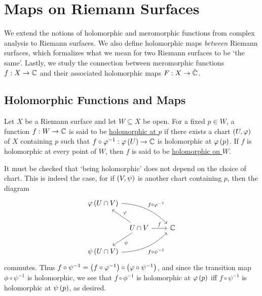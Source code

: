 \documentclass[../Moduli_Spaces_of_Riemann_Surfaces.tex]{subfiles}
\begin{document}
    \section{Maps on Riemann Surfaces}\label{sec:maps_on_Riemann_surfaces}
    We extend the notions of holomorphic and meromorphic functions from complex analysis to Riemann surfaces. We also define holomorphic maps \textit{between} Riemann surfaces, which formalizes what we mean for two Riemann surfaces to be `the same'. Lastly, we study the connection between meromorphic functions $f:X\to\mathbb{C}$ and their associated holomorphic maps $F:X\to\hat{\mathbb{C}}$.
    \subsection{Holomorphic Functions and Maps}
    \begin{definition}
        Let $X$ be a Riemann surface and let $W\subseteq X$ be open. For a fixed $p\in W$, a function $f:W\to\mathbb{C}$ is said to be \ul{holomorphic at $p$} if there exists a chart $\left(U,\varphi\right)$ of $X$ containing $p$ such that $f\circ\varphi^{-1}:\varphi\left(U\right)\to\mathbb{C}$ is holomorphic at $\varphi\left(p\right)$. If $f$ is holomorphic at every point of $W$, then $f$ is said to be \ul{holomorphic on $W$}.
    \end{definition}
    \begin{remark}
        It must be checked that $\textrm{`}$being holomorphic$\textrm{'}$ does not depend on the choice of chart. This is indeed the case, for if $\left(V,\psi\right)$ is another chart containing $p$, then the diagram
        \begin{equation}\label{RS:eqn:holomorphic_function_well_defined}
            \begin{tikzcd}[column sep = 0.1in]
                \phi\l(U\cap V\r) \ar[drrrr, "f\circ\phi^{-1}", bend left = 20] \\
                & U\cap V \ar[ul, "\phi"'] \ar[dl, "\psi"] \ar[rrr, "f"] & & & \C \\
                \psi\l(U\cap V\r) \ar [urrrr, "f\circ\psi^{-1}"', bend right = 20]
            \end{tikzcd}
        \end{equation}
        commutes. Thus $f\circ\psi^{-1}=\left(f\circ\varphi^{-1}\right)\circ\left(\varphi\circ\psi^{-1}\right)$, and since the transition map $\phi\circ\psi^{-1}$ is holomorphic, we see that $f\circ\phi^{-1}$ is holomorphic at $\varphi\left(p\right)$ iff $f\circ\psi^{-1}$ is holomorphic at $\psi\left(p\right)$, as desired.\exqed
    \end{remark}
\end{document}
